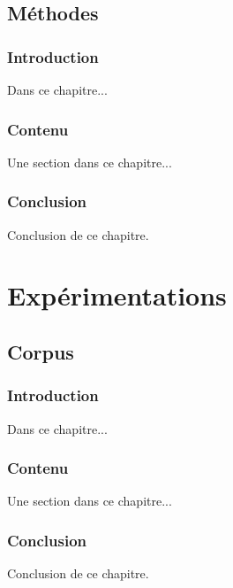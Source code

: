 \documentclass[a4paper,11pt,twoside]{memoir}
\begin{document}


\chapter{Méthodes}
\label{chap:methodes}
\minitoc

\section{Introduction}
Dans ce chapitre...




\section{Contenu}
Une section dans ce chapitre...



\section{Conclusion}
Conclusion de ce chapitre.



\part{Expérimentations}





\chapter{Corpus}
\label{chap:corpus}
\minitoc

\section{Introduction}
Dans ce chapitre...



\section{Contenu}
Une section dans ce chapitre...

\section{Conclusion}
Conclusion de ce chapitre.
\end{document}
